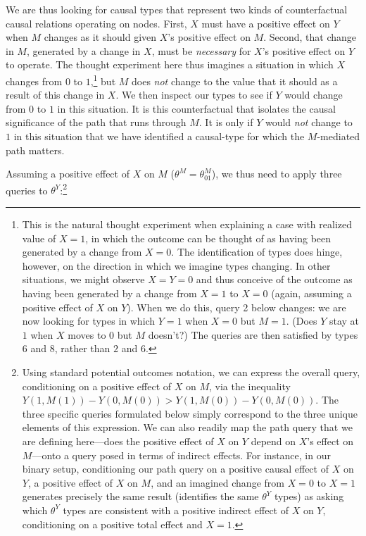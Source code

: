 \documentclass[12pt,]{book}
\let\rmarkdownfootnote\footnote%
\def\footnote{\protect\rmarkdownfootnote}
\begin{document}
We are thus looking for causal types that represent two kinds of counterfactual causal relations operating on nodes. First, \(X\) must have a positive effect on \(Y\) when \(M\) changes as it should given \(X\)'s positive effect on \(M\). Second, that change in \(M\), generated by a change in \(X\), must be \emph{necessary} for \(X\)'s positive effect on \(Y\) to operate. The thought experiment here thus imagines a situation in which \(X\) changes from \(0\) to \(1\),\footnote{This is the natural thought experiment when explaining a case with realized value of \(X=1\), in which the outcome can be thought of as having been generated by a change from \(X=0\). The identification of types does hinge, however, on the direction in which we imagine types changing. In other situations, we might observe \(X=Y=0\) and thus conceive of the outcome as having been generated by a change from \(X=1\) to \(X=0\) (again, assuming a positive effect of \(X\) on \(Y\)). When we do this, query 2 below changes: we are now looking for types in which \(Y=1\) when \(X=0\) but \(M=1\). (Does \(Y\) stay at \(1\) when \(X\) moves to \(0\) but \(M\) doesn't?) The queries are then satisfied by types \(6\) and \(8\), rather than \(2\) and \(6\).} but \(M\) does \emph{not} change to the value that it should as a result of this change in \(X\). We then inspect our types to see if \(Y\) would change from \(0\) to \(1\) in this situation. It is this counterfactual that isolates the causal significance of the path that runs through \(M\). It is only if \(Y\) would \emph{not} change to \(1\) in this situation that we have identified a causal-type for which the \(M\)-mediated path matters.

Assuming a positive effect of \(X\) on \(M\) (\(\theta^M=\theta^M_{01}\)), we thus need to apply three queries to \(\theta^Y\):\footnote{Using standard potential outcomes notation, we can express the overall query, conditioning on a positive effect of \(X\) on \(M\), via the inequality \(Y(1, M(1)) - Y(0, M(0)) > Y(1, M(0)) - Y(0, M(0))\). The three specific queries formulated below simply correspond to the three unique elements of this expression. We can also readily map the path query that we are defining here---does the positive effect of \(X\) on \(Y\) depend on \(X\)'s effect on \(M\)---onto a query posed in terms of indirect effects. For instance, in our binary setup, conditioning our path query on a positive causal effect of \(X\) on \(Y\), a positive effect of \(X\) on \(M\), and an imagined change from \(X=0\) to \(X=1\) generates precisely the same result (identifies the same \(\theta^Y\) types) as asking which \(\theta^Y\) types are consistent with a positive indirect effect of \(X\) on \(Y\), conditioning on a positive total effect and \(X=1\).}
\end{document}

